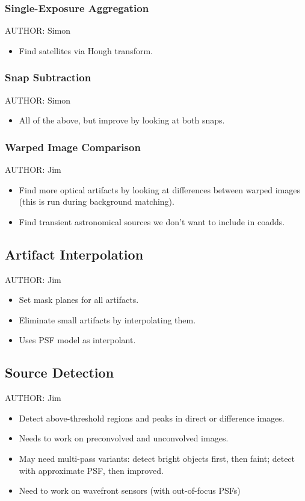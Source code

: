 \subsubsection{Single-Exposure Aggregation}
AUTHOR: Simon
\begin{itemize}
\item Find satellites via Hough transform.
\end{itemize}

\subsubsection{Snap Subtraction}
\label{sec:acSnapSubtraction}
AUTHOR: Simon
\begin{itemize}
\item All of the above, but improve by looking at both snaps.
\end{itemize}

\subsubsection{Warped Image Comparison}
\label{sec:acWarpedImageArtifactDetection}
AUTHOR: Jim
\begin{itemize}
\item Find more optical artifacts by looking at differences between warped images (this is run during background matching).
\item Find transient astronomical sources we don't want to include in coadds.
\end{itemize}

\subsection{Artifact Interpolation}
\label{sec:acArtifactInterpolation}
AUTHOR: Jim
\begin{itemize}
\item Set mask planes for all artifacts.
\item Eliminate small artifacts by interpolating them.
\item Uses PSF model as interpolant.
\end{itemize}

\subsection{Source Detection}
\label{sec:acSourceDetection}
AUTHOR: Jim
\begin{itemize}
\item Detect above-threshold regions and peaks in direct or difference images.
\item Needs to work on preconvolved and unconvolved images.
\item May need multi-pass variants: detect bright objects first, then faint; detect with approximate PSF, then improved.
\item Need to work on wavefront sensors (with out-of-focus PSFs)
\end{itemize}

